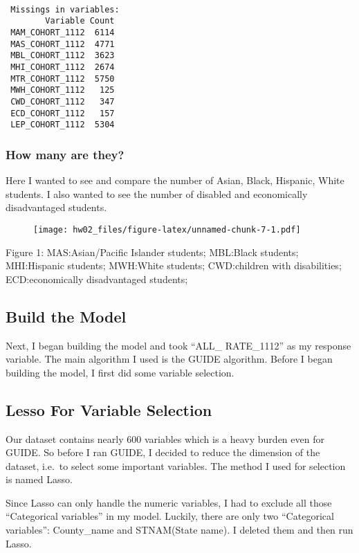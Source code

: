 \documentclass[]{article}
\begin{document}
\begin{verbatim}

 Missings in variables:
        Variable Count
 MAM_COHORT_1112  6114
 MAS_COHORT_1112  4771
 MBL_COHORT_1112  3623
 MHI_COHORT_1112  2674
 MTR_COHORT_1112  5750
 MWH_COHORT_1112   125
 CWD_COHORT_1112   347
 ECD_COHORT_1112   157
 LEP_COHORT_1112  5304
\end{verbatim}

\subsubsection{How many are they?}\label{how-many-are-they}

Here I wanted to see and compare the number of Asian, Black, Hispanic,
White students. I also wanted to see the number of disabled and
economically disadvantaged students.

\begin{figure}[H]
\centering
\texttt{[image: hw02\_files/figure-latex/unnamed-chunk-7-1.pdf]}
\caption{}
\end{figure}

Figure 1: MAS:Asian/Pacific Islander students; MBL:Black students; MHI:Hispanic
students; MWH:White students; CWD:children with disabilities;
ECD:economically disadvantaged students;

\subsection{Build the Model}\label{build-the-model}

Next, I began building the model and took ``ALL\_ RATE\_1112'' as my
response variable. The main algorithm I used is the GUIDE algorithm.
Before I began building the model, I first did some variable selection.

\subsection{Lesso For Variable
Selection}\label{lesso-for-variable-selection}

Our dataset contains nearly 600 variables which is a heavy burden even
for GUIDE. So before I ran GUIDE, I decided to reduce the dimension of
the dataset, i.e.~to select some important variables. The method I used
for selection is named Lasso.

Since Lasso can only handle the numeric variables, I had to exclude all
those ``Categorical variables'' in my model. Luckily, there are only two
``Categorical variables'': County\_name and STNAM(State name). I deleted
them and then run Lasso.
\end{document}
